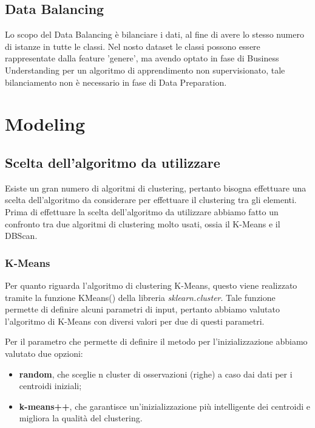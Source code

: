 \documentclass[a4paper, 10pt]{report}
\begin{document}
        \section{Data Balancing}\label{sec:data-balancing}
            Lo scopo del Data Balancing è bilanciare i dati, al fine di avere lo stesso numero di istanze in tutte le classi.
            Nel nosto dataset le classi possono essere rappresentate dalla feature 'genere', ma avendo optato in fase di
            Business Understanding per un algoritmo di apprendimento non supervisionato, tale bilanciamento non è necessario
            in fase di Data Preparation.


    \chapter{Modeling}\label{ch:modeling}

        \section{Scelta dell'algoritmo da utilizzare}\label{sec:scelta-dell'algoritmo-da-utilizzare}
            Esiste un gran numero di algoritmi di clustering, pertanto bisogna effettuare una scelta dell'algoritmo da considerare
            per effettuare il clustering tra gli elementi.
            Prima di effettuare la scelta dell'algoritmo da utilizzare abbiamo fatto un confronto tra due algoritmi di clustering molto
            usati, ossia il K-Means e il DBScan.

            \subsection{K-Means}
                Per quanto riguarda l'algoritmo di clustering K-Means, questo viene realizzato tramite la funzione KMeans()
                della libreria \textit{sklearn.cluster}.
                Tale funzione permette di definire alcuni parametri di input, pertanto abbiamo valutato l'algoritmo di K-Means
                con diversi valori per due di questi parametri.

                Per il parametro che permette di definire il metodo per l'inizializzazione abbiamo valutato due opzioni:
                    \begin{itemize}
                        \item \textbf{random}, che sceglie n cluster di osservazioni (righe) a caso dai dati per i centroidi iniziali;
                        \item \textbf{k-means++}, che garantisce un'inizializzazione più intelligente dei centroidi e migliora la qualità del clustering.
                    \end{itemize}
\end{document}
